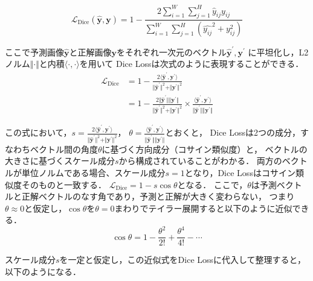 \documentclass[10pt, a4paper, twocolumn]{jarticle}
\begin{document}
\begin{equation}
  \mathcal{L}_{\text{Dice}}(\hat{\mathbf{y}}, \mathbf{y}) = 1 - \frac{2 \sum_{i=1}^{W} \sum_{j=1}^{H} \hat{y}_{ij} y_{ij}}{\sum_{i=1}^{W} \sum_{j=1}^{H}(\hat{y_{ij}} ^ 2 + y_{ij} ^ 2)}
\end{equation}

ここで予測画像$\hat{\mathbf{y}}$と正解画像$\mathbf{y}$をそれぞれ一次元のベクトル$\hat{\mathbf{y}} ^ {\prime}, {\mathbf{y}} ^ {\prime}$
に平坦化し，L2ノルム$\Vert \cdot \Vert$と内積$\langle \cdot, \cdot \rangle $を用いて
Dice Lossは次式のように表現することができる．
\begin{equation}
  \begin{aligned}
    \mathcal{L}_{\text{Dice}} &= 1 - \frac{2 \langle \hat{\mathbf{y}} ^ {\prime}, {\mathbf{y}} ^ {\prime} \rangle}{\Vert \hat{\mathbf{y}} ^ {\prime} \Vert ^ 2 + \Vert {\mathbf{y}} ^ {\prime} \Vert ^ 2} \\
    &= 1 - \frac{2 \Vert \hat{\mathbf{y}} ^ {\prime} \Vert \Vert {\mathbf{y}} ^ {\prime} \Vert}{\Vert \hat{\mathbf{y}} ^ {\prime} \Vert ^ 2 + \Vert {\mathbf{y}} ^ {\prime} \Vert ^ 2}
    \times \frac{\langle \hat{\mathbf{y}} ^ {\prime}, {\mathbf{y}} ^ {\prime} \rangle}{\Vert \hat{\mathbf{y}} ^ {\prime} \Vert \Vert {\mathbf{y}} ^ {\prime} \Vert}
  \end{aligned}
\end{equation}

この式において，$s = \frac{2 \langle \hat{\mathbf{y}} ^ {\prime}, {\mathbf{y}} ^ {\prime} \rangle}{\Vert \hat{\mathbf{y}} ^ {\prime} \Vert ^ 2 + \Vert {\mathbf{y}} ^ {\prime} \Vert ^ 2}$，
$\theta = \frac{\langle \hat{\mathbf{y}} ^ {\prime}, {\mathbf{y}} ^ {\prime} \rangle}{\Vert \hat{\mathbf{y}} ^ {\prime} \Vert \Vert {\mathbf{y}} ^ {\prime} \Vert}$とおくと，
Dice Lossは2つの成分，すなわちベクトル間の角度$\theta$に基づく方向成分（コサイン類似度）と，
ベクトルの大きさに基づくスケール成分$s$から構成されていることがわかる．
両方のベクトルが単位ノルムである場合、スケール成分$s=1$となり，Dice Lossはコサイン類似度そのものと一致する．
$\mathcal{L}_{\text{Dice}} = 1 - s \cos{\theta}$となる．
ここで，$\theta$は予測ベクトルと正解ベクトルのなす角であり，予測と正解が大きく変わらない，
つまり$\theta \approx 0$と仮定し，$\cos{\theta}$を$\theta = 0$まわりでテイラー展開すると以下のように近似できる．
\begin{equation}
  \cos{\theta} = 1 - \frac{\theta ^ 2}{2!} + \frac{\theta ^ 4}{4!} - \cdots
\end{equation}

スケール成分$s$を一定と仮定し，この近似式をDice Lossに代入して整理すると，以下のようになる．
\end{document}
